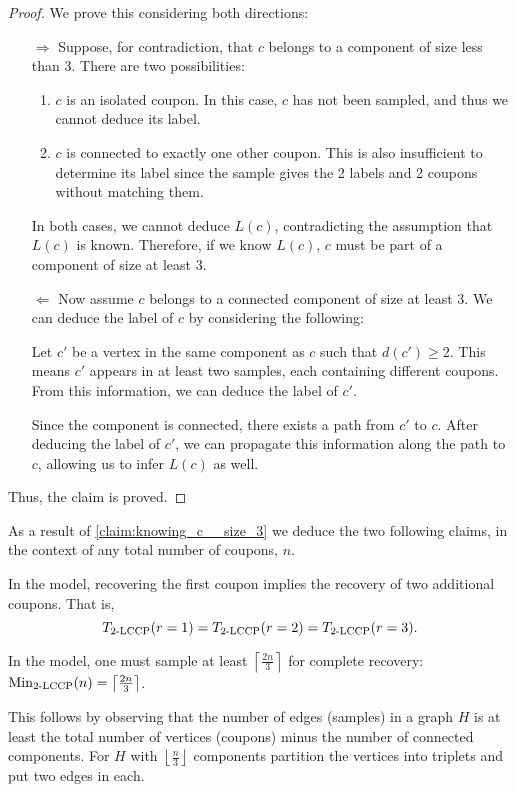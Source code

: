 \begin{proof}   
We prove this considering both directions:

\begin{itemize}
    \item[$\Rightarrow$] 
    Suppose, for contradiction, that $c$ belongs to a component of size less than 3. There are two possibilities:
    \begin{enumerate}
        \item $c$ is an isolated coupon. In this case, $c$ has not been sampled, and thus we cannot deduce its label.
        \item $c$ is connected to exactly one other coupon. This is also insufficient to determine its label since the sample gives the 2 labels and 2 coupons without matching them.
    \end{enumerate}
    In both cases, we cannot deduce $L(c)$, contradicting the assumption that $L(c)$ is known. Therefore, if we know $L(c)$, $c$ must be part of a component of size at least 3.
    
    \item[$\Leftarrow$] 
    Now assume $c$ belongs to a connected component of size at least 3. We can deduce the label of $c$ by considering the following:
    
    Let $c'$ be a vertex in the same component as $c$ such that $d(c') \geq 2$. This means $c'$ appears in at least two samples, each containing different coupons. From this information, we can deduce the label of $c'$.
    
    Since the component is connected, there exists a path from $c'$ to $c$. After deducing the label of $c'$, we can propagate this information along the path to $c$, allowing us to infer $L(c)$ as well.
\end{itemize}

Thus, the claim is proved.
\end{proof}

As a result of \autoref{claim:knowing_c__size_3} we deduce the two following claims, 
in the context of any total number of coupons, $n$.
\begin{claim}
In the  model, recovering the first coupon implies the recovery of two additional coupons. That is,
    \vspace{-1ex}
    $$\T{\kecd{2}{n}}{r=1}  = \T{\kecd{2}{n}}{r=2} = \T{\kecd{2}{n}}{r=3}.$$
\end{claim}

\begin{claim}
\label{claim:minimum_2ECD}
In the  model, one must sample at least $\left\lceil \frac{2n}{3}\right\rceil$ for complete recovery:
$\Min{\kecd{2}{n}}{n} = \left\lceil \frac{2n}{3}\right\rceil$.
\end{claim}
This follows by observing that the number of edges (samples) in a graph $H$ 
is at least the total number of vertices (coupons) minus the number of connected components. 
For $H$ with $\left\lfloor \frac{n}{3}\right\rfloor$ components partition the vertices into triplets  and put two edges in each.

